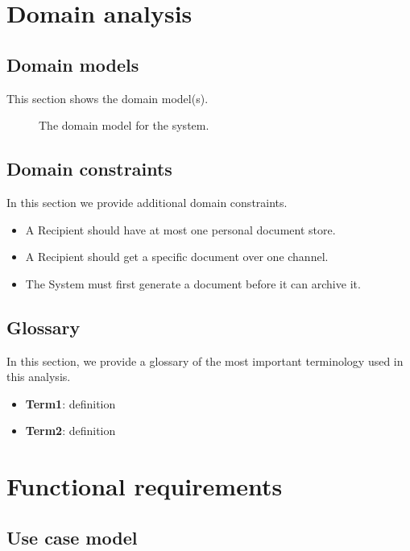 \documentclass[a4paper,10pt]{article}
\begin{document}


\tableofcontents
\newpage

\section{Domain analysis}\label{sec:domain}
\subsection{Domain models}
This section shows the domain model(s).

\begin{figure}[!htp]
    \centering
    \caption{The domain model for the system.}\label{fig:domain_model}
\end{figure}

\subsection{Domain constraints}
In this section we provide additional domain constraints.

\begin{itemize}
    \item A Recipient should have at most one personal document store.
    \item A Recipient should get a specific document over one channel.
    \item The System must first generate a document before it can archive it.
\end{itemize}

\subsection{Glossary}
In this section, we provide a glossary of the most important terminology used
in this analysis.

\begin{itemize}
    \item \textbf{Term1}: definition
    \item \textbf{Term2}: definition
\end{itemize}

\section{Functional requirements}\label{sec:functional}
\subsection*{Use case model}
\end{document}

